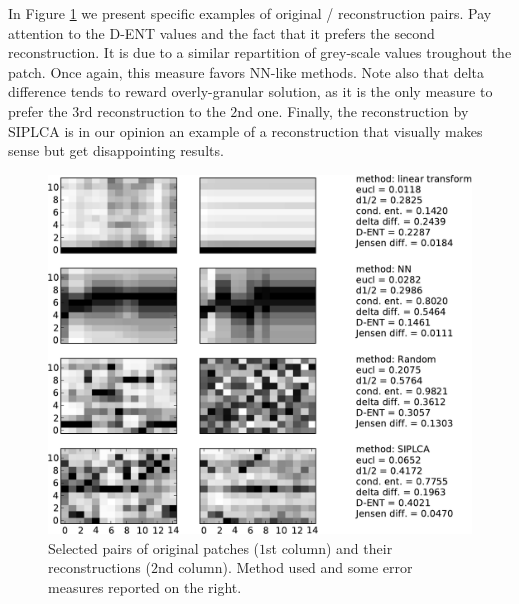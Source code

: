 \documentclass{article}
\begin{document}
In Figure \ref{fig:origrecon} we present specific examples of original
/ reconstruction pairs. Pay attention to the D-ENT values and the fact
that it prefers the second reconstruction.  It is due to a similar
repartition of grey-scale values troughout the patch. Once again,
this measure favors NN-like methods. Note also that delta difference
tends to reward overly-granular solution, as it is the only measure to
prefer the $3$rd reconstruction to the $2$nd one. Finally, the
reconstruction by SIPLCA is in our opinion an example of a
reconstruction that visually makes sense but get disappointing results.

\begin{figure}[t]
\begin{center}
\includegraphics[width=.9\columnwidth]{original_recons}
\end{center}
\caption{Selected pairs of original patches ($1$st column)
and their reconstructions ($2$nd column). 
Method used and some error measures
reported on the right.
\label{fig:origrecon}}
\end{figure}
\end{document}
